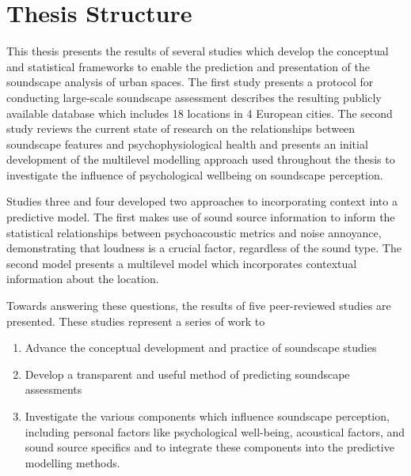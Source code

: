 \section{Thesis Structure}

This thesis presents the results of several studies which develop the conceptual and statistical frameworks to enable the prediction and presentation of the soundscape analysis of urban spaces. The first study presents a protocol for conducting large-scale soundscape assessment describes the resulting publicly available database which includes 18 locations in 4 European cities. The second study reviews the current state of research on the relationships between soundscape features and psychophysiological health and presents an initial development of the multilevel modelling approach used throughout the thesis to investigate the influence of psychological wellbeing on soundscape perception.

Studies three and four developed two approaches to incorporating context into a predictive model. The first makes use of sound source information to inform the statistical relationships between psychoacoustic metrics and noise annoyance, demonstrating that loudness is a crucial factor, regardless of the sound type. The second model presents a multilevel model which incorporates contextual information about the location.

Towards answering these questions, the results of five %
peer-reviewed studies are presented. These studies represent a series of work to

\begin{enumerate}
  \item Advance the conceptual development and practice of soundscape studies
  \item Develop a transparent and useful method of predicting soundscape assessments
  \item Investigate the various components which influence soundscape perception, including personal factors like psychological well-being, acoustical factors, and sound source specifics and to integrate these components into the predictive modelling methods.
\end{enumerate}

